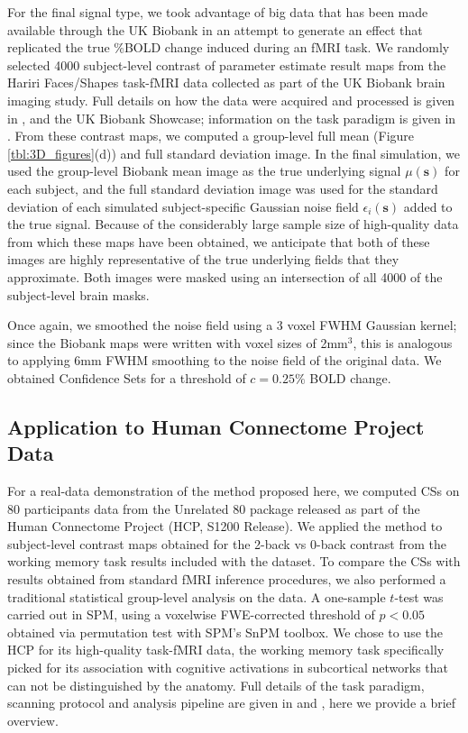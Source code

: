 For the final signal type, we took advantage of big data that has been made available through the UK Biobank in an attempt to generate an effect that replicated the true \%BOLD change induced during an fMRI task. We randomly selected 4000 subject-level contrast of parameter estimate result maps from the Hariri Faces/Shapes task-fMRI data collected as part of the UK Biobank brain imaging study. Full details on how the data were acquired and processed is given in \citet{Miller2016-hd}, \citet{Alfaro-Almagro2018-ip} and the UK Biobank Showcase; information on the task paradigm is given in \citet{Hariri2002-ns}. From these contrast maps, we computed a group-level full mean (Figure \ref{tbl:3D_figures}(d)) and full standard deviation image. In the final simulation, we used the group-level Biobank mean image as the true underlying signal $\mu(\bm{s})$ for each subject, and the full standard deviation image was used for the standard deviation of each simulated subject-specific Gaussian noise field $\epsilon_{i}(\bm{s})$ added to the true signal. Because of the considerably large sample size of high-quality data from which these maps have been obtained, we anticipate that both of these images are highly representative of the true underlying fields that they approximate. Both images were masked using an intersection of all 4000 of the subject-level brain masks. 

Once again, we smoothed the noise field using a 3 voxel FWHM Gaussian kernel; since the Biobank maps were written with voxel sizes of 2mm$^{3}$, this is analogous to applying 6mm FWHM smoothing to the noise field of the original data. We obtained Confidence Sets for a threshold of $c = 0.25\%$ BOLD change. 


\subsection{Application to Human Connectome Project Data}
\label{sec:HCP_methods}

For a real-data demonstration of the method proposed here, we computed CSs on 80 participants data from the Unrelated 80 package released as part of the Human Connectome Project (HCP, S1200 Release). We applied the method to subject-level contrast maps obtained for the 2-back vs 0-back contrast from the working memory task results included with the dataset. To compare the CSs with results obtained from standard fMRI inference procedures, we also performed a traditional statistical group-level analysis on the data. A one-sample $t$-test was carried out in SPM, using a voxelwise FWE-corrected threshold of $p < 0.05$ obtained via permutation test with SPM's SnPM toolbox. We chose to use the HCP for its high-quality task-fMRI data, the working memory task specifically picked for its association with cognitive activations in subcortical networks that can not be distinguished by the anatomy. Full details of the task paradigm, scanning protocol and analysis pipeline are given in \citet{Barch2013-kk} and \citet{Glasser2013-qc}, here we provide a brief overview. 


